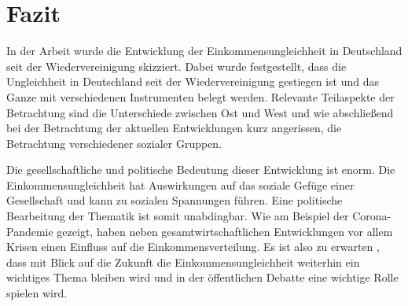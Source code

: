 \documentclass[a4paper,12pt]{article}
\begin{document}

\section*{Fazit}

In der Arbeit wurde die Entwicklung der Einkommensungleichheit in Deutschland seit der Wiedervereinigung skizziert. Dabei wurde festgestellt, dass die Ungleichheit in Deutschland seit der Wiedervereinigung gestiegen ist und das Ganze mit verschiedenen Instrumenten belegt werden. Relevante Teilaspekte der Betrachtung sind die Unterschiede zwischen Ost und West und wie abschließend bei der Betrachtung der aktuellen Entwicklungen kurz angerissen, die Betrachtung verschiedener sozialer Gruppen.

Die gesellschaftliche und politische Bedeutung dieser Entwicklung ist enorm. Die Einkommensungleichheit hat Auswirkungen auf das soziale Gefüge einer Gesellschaft und kann zu sozialen Spannungen führen. Eine politische Bearbeitung der Thematik ist somit unabdingbar. Wie am Beispiel der Corona-Pandemie gezeigt, haben neben gesamtwirtschaftlichen Entwicklungen vor allem Krisen einen Einfluss auf die Einkommensverteilung. Es ist also zu erwarten , dass mit Blick auf die Zukunft die Einkommensungleichheit weiterhin ein wichtiges Thema bleiben wird und in der öffentlichen Debatte eine wichtige Rolle spielen wird.







\newpage
{}
\printbibliography
\thispagestyle{empty}
\end{document}
